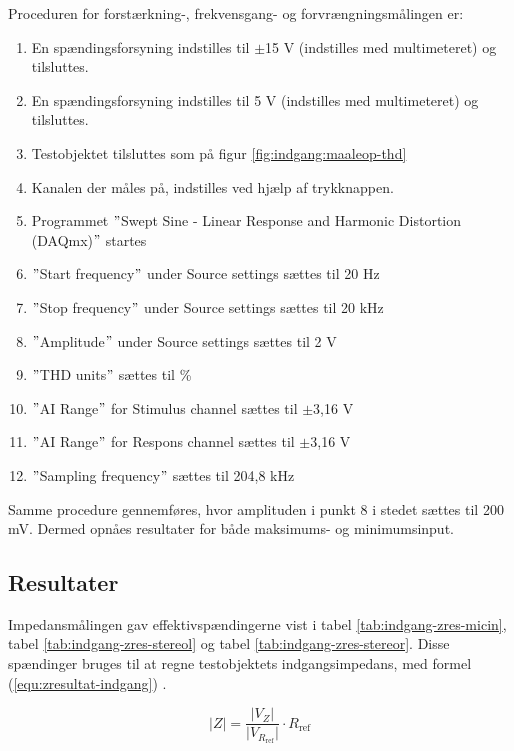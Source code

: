 Proceduren for forstærkning-, frekvensgang- og forvrængningsmålingen er:

\begin{enumerate}
\item En spændingsforsyning indstilles til $\pm$15 V (indstilles med multimeteret) og tilsluttes.
\item En spændingsforsyning indstilles til 5 V (indstilles med multimeteret) og tilsluttes.
\item Testobjektet tilsluttes som på figur \ref{fig:indgang:maaleop-thd}
\item Kanalen der måles på, indstilles ved hjælp af trykknappen.
\item Programmet $"$Swept Sine - Linear Response and Harmonic Distortion (DAQmx)$"$ startes
\item $"$Start frequency$"$ under Source settings sættes til 20 Hz
\item $"$Stop frequency$"$ under Source settings sættes til 20 kHz
\item $"$Amplitude$"$ under Source settings sættes til 2 V
\item $"$THD units$"$ sættes til \%
\item $"$AI Range$"$ for Stimulus channel sættes til $\pm$3,16 V
\item $"$AI Range$"$ for Respons channel sættes til $\pm$3,16 V
\item $"$Sampling frequency$"$ sættes til 204,8 kHz
\end{enumerate}

Samme procedure gennemføres, hvor amplituden i punkt 8 i stedet sættes til 200 mV. Dermed opnåes resultater for både maksimums- og minimumsinput. 

\subsection*{Resultater}
\label{maalejournal_resultater}

Impedansmålingen gav effektivspændingerne vist i tabel \ref{tab:indgang-zres-micin}, tabel \ref{tab:indgang-zres-stereol} og tabel \ref{tab:indgang-zres-stereor}. Disse spændinger bruges til at regne testobjektets indgangsimpedans, med formel (\ref{equ:zresultat-indgang}) \cite{maaling-mm4}.%

\begin{equation}
\label{equ:zresultat-indgang}
\vert Z \vert = \frac{\vert V_Z \vert}{\vert V_{R_\mathrm{ref}} \vert} \cdot R_\mathrm{ref}
\end{equation} 

